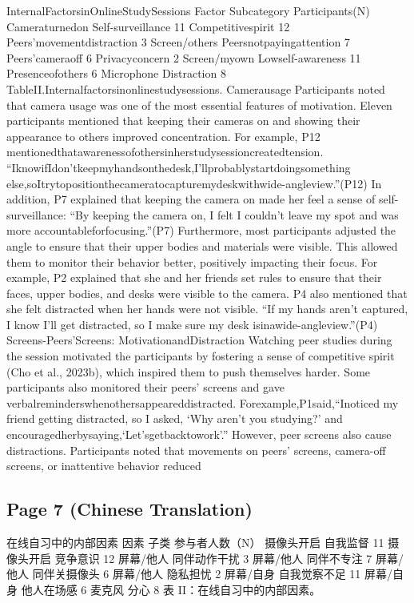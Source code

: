 \documentclass[12pt]{ctexart}
\begin{document}
InternalFactorsinOnlineStudySessions
Factor Subcategory Participants(N)
Cameraturnedon Self-surveillance 11
Competitivespirit 12
Peers’movementdistraction 3
Screen/others
Peersnotpayingattention 7
Peers’cameraoff 6
Privacyconcern 2
Screen/myown
Lowself-awareness 11
Presenceofothers 6
Microphone
Distraction 8
TableII.Internalfactorsinonlinestudysessions.
Camerausage
Participants noted that camera usage was one of the most essential features of
motivation. Eleven participants mentioned that keeping their cameras on and
showing their appearance to others improved concentration. For example, P12
mentionedthatawarenessofothersinherstudysessioncreatedtension.
“IknowifIdon’tkeepmyhandsonthedesk,I’llprobablystartdoingsomething
else,soItrytopositionthecameratocapturemydeskwithwide-angleview.”(P12)
In addition, P7 explained that keeping the camera on made her feel a sense of
self-surveillance:
“By keeping the camera on, I felt I couldn’t leave my spot and was more
accountableforfocusing.”(P7)
Furthermore, most participants adjusted the angle to ensure that their upper
bodies and materials were visible. This allowed them to monitor their behavior
better, positively impacting their focus. For example, P2 explained that she and her
friends set rules to ensure that their faces, upper bodies, and desks were visible to
the camera. P4 also mentioned that she felt distracted when her hands were not
visible.
“If my hands aren’t captured, I know I’ll get distracted, so I make sure my desk
isinawide-angleview.”(P4)
Screens-Peers’Screens: MotivationandDistraction
Watching peer studies during the session motivated the participants by fostering a
sense of competitive spirit (Cho et al., 2023b), which inspired them to push
themselves harder. Some participants also monitored their peers’ screens and gave
verbalreminderswhenothersappeareddistracted. Forexample,P1said,“Inoticed
my friend getting distracted, so I asked, ‘Why aren’t you studying?’ and
encouragedherbysaying,‘Let’sgetbacktowork’.”
However, peer screens also cause distractions. Participants noted that
movements on peers’ screens, camera-off screens, or inattentive behavior reduced

\subsection*{Page 7 (Chinese Translation)}

在线自习中的内部因素
因素  子类  参与者人数（N）
摄像头开启  自我监督  11
摄像头开启  竞争意识  12
屏幕/他人  同伴动作干扰  3
屏幕/他人  同伴不专注  7
屏幕/他人  同伴关摄像头  6
屏幕/他人  隐私担忧  2
屏幕/自身  自我觉察不足  11
屏幕/自身  他人在场感  6
麦克风  分心  8
表 II：在线自习中的内部因素。
\end{document}
